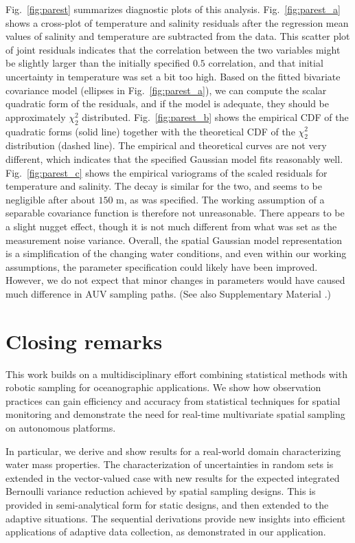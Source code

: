\documentclass[aoas]{imsart}
\begin{document}
Fig.~\ref{fig:parest} summarizes diagnostic plots of this
analysis. Fig.~\ref{fig:parest_a} shows a cross-plot of temperature
and salinity residuals after the regression mean values of salinity
and temperature are subtracted from the data. This scatter plot of
joint residuals indicates that the correlation between the two
variables might be slightly larger than the initially specified $0.5$ correlation,
and that initial uncertainty in temperature was set a bit too high. Based on
the fitted bivariate covariance model (ellipses in
Fig.~\ref{fig:parest_a}), we can compute the scalar quadratic form of
the residuals, and if the model is adequate, they should be
approximately $\chi^2_2$ distributed. Fig.~\ref{fig:parest_b} shows
the empirical CDF of the quadratic forms (solid line) together with the
theoretical CDF of the $\chi^2_2$ distribution (dashed line). The empirical
and theoretical curves are not very different, which indicates that
the specified Gaussian model fits reasonably
well. Fig.~\ref{fig:parest_c} shows the empirical variograms of the
scaled residuals for temperature and salinity. The decay is similar
for the two, and seems to be negligible after about $150$ m, as was
specified. The working assumption of a separable covariance function
is therefore not unreasonable. There appears to be a slight nugget effect, though it is not much different from what was set as the measurement noise variance.
Overall, the spatial Gaussian model representation is a simplification
of the changing water conditions, and even within our working assumptions,
the parameter specification could likely have been
improved. However, we do not expect that minor changes in parameters would have caused much
difference in AUV sampling paths. (See also Supplementary Material \citep{suppA}.)

\section{Closing remarks}
\label{sec:concl_disc}

This work builds on a multidisciplinary effort combining statistical
methods with robotic sampling for oceanographic applications. We show
how observation practices can gain efficiency and accuracy from
statistical techniques for spatial monitoring and demonstrate the
need for real-time multivariate spatial sampling on autonomous
platforms.

In particular, we derive and show results for a real-world domain
characterizing water mass properties. The characterization of
uncertainties in random sets is extended in the vector-valued case
with new results for the expected integrated Bernoulli variance
reduction achieved by spatial sampling designs. This is provided in
semi-analytical form for static designs, and then extended to the
adaptive situations. The sequential derivations provide new insights
into efficient applications of adaptive data collection, as
demonstrated in our application.
\end{document}
